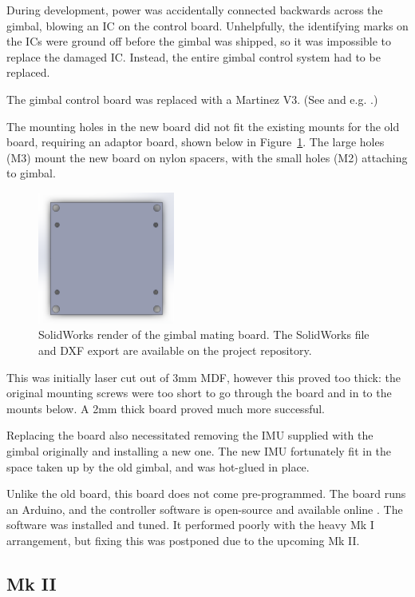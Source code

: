 \documentclass[12pt,oneside,a4paper]{book}
\begin{document}
During development, power was accidentally connected backwards across
the gimbal, blowing an IC on the control board. Unhelpfully, the
identifying marks on the ICs were ground off before the gimbal was
shipped, so it was impossible to replace the damaged IC. Instead, the
entire gimbal control system had to be replaced.

The gimbal control board was replaced with a Martinez V3. (See  and e.g. \cite{martinez}.)

The mounting holes in the new board did not fit the existing
mounts for the old board, requiring an adaptor board, shown below in
Figure~\ref{fig:gmb}. The large holes (M3) mount the new board on
nylon spacers, with the small holes (M2) attaching to gimbal.

\begin{figure}[h]
  \centering
  \includegraphics[width=0.4\textwidth]{figs/gmb}
  \caption{SolidWorks render of the gimbal mating board. The
    SolidWorks file and DXF export are available on the project repository.}
  \label{fig:gmb}
\end{figure}

This was initially laser cut out of 3mm MDF,
however this proved too thick: the original mounting screws were too
short to go through the board and in to the mounts below. A 2mm thick board
proved much more successful.
 
Replacing the board also necessitated removing the IMU supplied with
the gimbal originally and installing a new one. The new IMU
fortunately fit in the space taken up by the old gimbal, and was
hot-glued in place.

Unlike the old board, this board does not come pre-programmed. The
board runs an Arduino, and the controller software is open-source and
available online \cite{gimbalsoftware}. The software was installed and
tuned. It performed poorly with the heavy Mk I arrangement, but fixing
this was postponed due to the upcoming Mk II.

\subsection{Mk II}
\label{sec:mk-ii}
\end{document}
